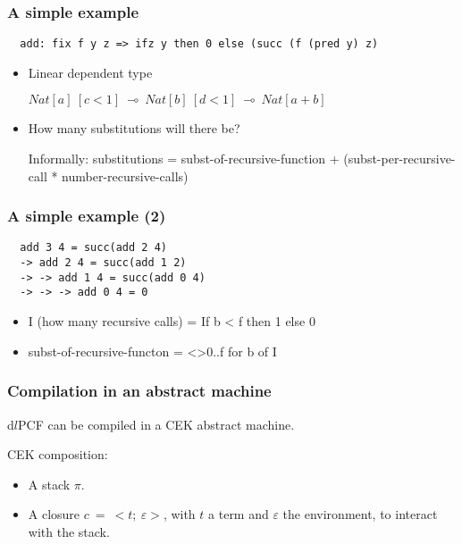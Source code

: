 \documentclass{beamer}
\begin{document}
\begin{frame}[fragile]
\frametitle{A simple example}
\begin{verbatim}
  add: fix f y z => ifz y then 0 else (succ (f (pred y) z)
\end{verbatim}
\begin{itemize}
\item Linear dependent type 

  $Nat[a]~[c < 1]~\multimap~Nat[b]~[d < 1]~\multimap~Nat[a + b]$

\item  How many substitutions will there be? 

  Informally: substitutions = subst-of-recursive-function +
  (subst-per-recursive-call * number-recursive-calls)

\end{itemize}
\end{frame}

\begin{frame}[fragile]
\frametitle{A simple example (2)}

\begin{verbatim}
  add 3 4 = succ(add 2 4)
  -> add 2 4 = succ(add 1 2)
  -> -> add 1 4 = succ(add 0 4)
  -> -> -> add 0 4 = 0
\end{verbatim}
\begin{itemize}
\item I (how many recursive calls) = If b < f then 1 else 0
\item subst-of-recursive-functon = <>0..f for b of I
\end{itemize}
\end{frame}

\begin{frame}
\frametitle{Compilation in an abstract machine}

d$l$PCF can be compiled in a CEK abstract machine.

\medskip

CEK composition:
\begin{itemize}
\item A stack $\pi$.
\item A closure $c~=~<t;~\varepsilon >$, with $t$ a term and $\varepsilon$ the
  environment, to interact with the stack.
\end{itemize}

\end{frame}
\end{document}
